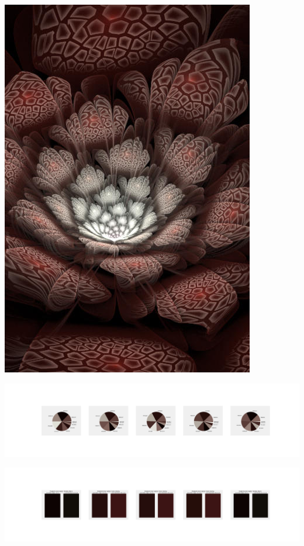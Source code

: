 \documentclass[11pt]{article}
\begin{document}
\begin{landscape}
    \begin{center}
    \includegraphics[width=\textwidth]{./nbimg/file (43).jpg}
    \end{center}

    \begin{center}
    \includegraphics[width=250mm]{./nbimg/pie-367.jpg}
    \end{center}

    \begin{center}
    \includegraphics[width=250mm]{./nbimg/peak-367.jpg}
    \end{center}
    


\end{landscape}
\end{document}
